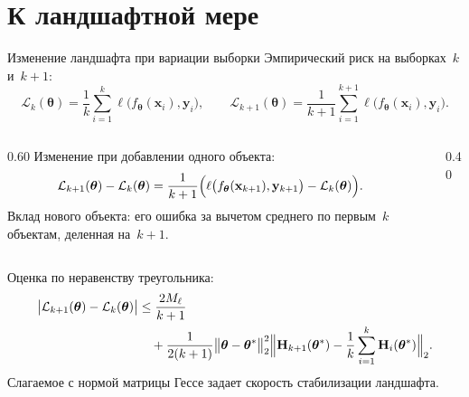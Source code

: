 \documentclass[9pt,pdf,hyperref={unicode}]{beamer}
\begin{document}
\section{К ландшафтной мере}
\begin{frame}{Изменение ландшафта при вариации выборки}
\justifying
\small
Эмпирический риск на выборках~$k$ и~$k+1$:
\[
    \mathcal{L}_k(\boldsymbol{\theta})=\frac{1}{k}\sum_{i=1}^{k}\ell\bigl(f_{\boldsymbol{\theta}}(\mathbf{x}_i),\mathbf{y}_i\bigr),\qquad
    \mathcal{L}_{k+1}(\boldsymbol{\theta})=\frac{1}{k+1}\sum_{i=1}^{k+1}\ell\bigl(f_{\boldsymbol{\theta}}(\mathbf{x}_i),\mathbf{y}_i\bigr).
\]
\begin{columns}[c]
\begin{column}{0.60\textwidth}
\scriptsize
Изменение при добавлении одного объекта:
\begin{align*}
    \mathcal{L}_{k+1}(\boldsymbol{\theta})-\mathcal{L}_k(\boldsymbol{\theta})
    &=\frac{1}{k+1}\Bigl(\ell\bigl(f_{\boldsymbol{\theta}}(\mathbf{x}_{k+1}),\mathbf{y}_{k+1}\bigr)-\mathcal{L}_k(\boldsymbol{\theta})\Bigr).
\end{align*}
Вклад нового объекта: его ошибка за вычетом среднего по первым~$k$ объектам, деленная на~$k+1$.
\end{column}
\begin{column}{0.40\textwidth}
\begin{center}
\end{center}
\end{column}
\end{columns}
Оценка по неравенству треугольника:
\begin{align*}
    \bigl|\mathcal{L}_{k+1}(\boldsymbol{\theta})-\mathcal{L}_k(\boldsymbol{\theta})\bigr|
    &\le \frac{2M_{\ell}}{k+1}\\
    &\quad+\frac{1}{2(k+1)}\bigl\|\boldsymbol{\theta}-\boldsymbol{\theta}^*\bigr\|_2^2
        \Bigl\|\mathbf{H}_{k+1}(\boldsymbol{\theta}^*)-\frac{1}{k}\sum_{i=1}^{k}\mathbf{H}_{i}(\boldsymbol{\theta}^*)\Bigr\|_2 .
\end{align*}
Слагаемое с нормой матрицы Гессе задает скорость стабилизации ландшафта.


\end{frame}
\end{document}
